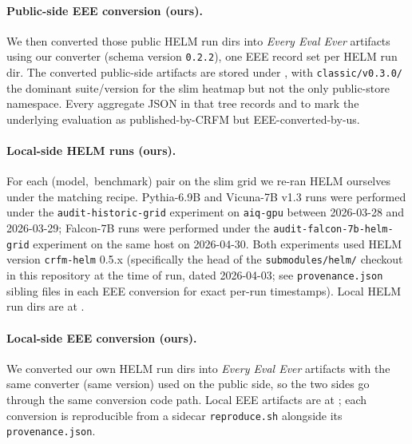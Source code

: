 \documentclass[11pt]{article}
\newcommand{\eee}{\textit{Every Eval Ever}\xspace}
\begin{document}
\paragraph{Public-side EEE conversion (ours).}
We then converted those public HELM run dirs into \eee{} artifacts
  using our  converter
  (schema version \texttt{0.2.2}), one EEE record set per
  HELM run dir.
The converted public-side artifacts are stored under
  ,
  with \texttt{classic/v0.3.0/} the dominant suite/version for the
  slim heatmap but not the only public-store namespace.
Every aggregate JSON in that tree records
  and  to
  mark the underlying evaluation as published-by-CRFM but
  EEE-converted-by-us.

\paragraph{Local-side HELM runs (ours).}
For each \mbox{(model, benchmark)} pair on the slim grid we re-ran
  HELM ourselves under the matching recipe.
Pythia-6.9B and Vicuna-7B v1.3 runs were performed under the
  \texttt{audit-historic-grid} experiment on
  \texttt{aiq-gpu} between 2026-03-28 and 2026-03-29;
  Falcon-7B runs were performed under the
  \texttt{audit-falcon-7b-helm-grid} experiment on the same host
  on 2026-04-30.
Both experiments used HELM version \texttt{crfm-helm} 0.5.x
  (specifically the head of the \texttt{submodules/helm/} checkout
  in this repository at the time of run, dated 2026-04-03; see
  \texttt{provenance.json} sibling files in each EEE conversion
  for exact per-run timestamps).
Local HELM run dirs are at
  .

\paragraph{Local-side EEE conversion (ours).}
We converted our own HELM run dirs into \eee{} artifacts with the
  same  converter (same
  version) used on the public side, so the two sides go through the
  same conversion code path.
Local EEE artifacts are at
  ;
  each conversion is reproducible from a sidecar \texttt{reproduce.sh}
  alongside its \texttt{provenance.json}.
\end{document}
